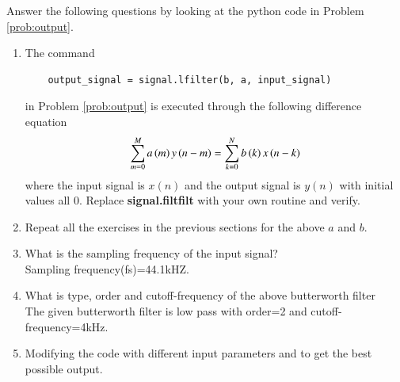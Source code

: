 \documentclass[journal,12pt,twocolumn]{IEEEtran}
\renewcommand\thesection{\arabic{section}}
\begin{document}
Answer the following questions by looking at the python code in Problem \ref{prob:output}.
\begin{enumerate}[label=\thesection.\arabic*]
\item
The command
\begin{lstlisting}
	output_signal = signal.lfilter(b, a, input_signal)
	\end{lstlisting}
in Problem \ref{prob:output} is executed through the following difference equation
\begin{equation}
\label{eq:iir_filter_gen}
 \sum _{m=0}^{M}a\left(m\right)y\left(n-m\right)=\sum _{k=0}^{N}b\left(k\right)x\left(n-k\right)
\end{equation}
%
where the input signal is $x(n)$ and the output signal is $y(n)$ with initial values all 0. Replace
\textbf{signal.filtfilt} with your own routine and verify.
%
\item Repeat all the exercises in the previous sections for the above $a$ and $b$.

\item What is the sampling frequency of the input signal?
\\
\solution
Sampling frequency(fs)=44.1kHZ.
\item
What is type, order and  cutoff-frequency of the above butterworth filter
\\
\solution
The given butterworth filter is low pass with order=2 and cutoff-frequency=4kHz.
%
\item
Modifying the code with different input parameters and to get the best possible output.
%
\end{enumerate}
\end{document}
